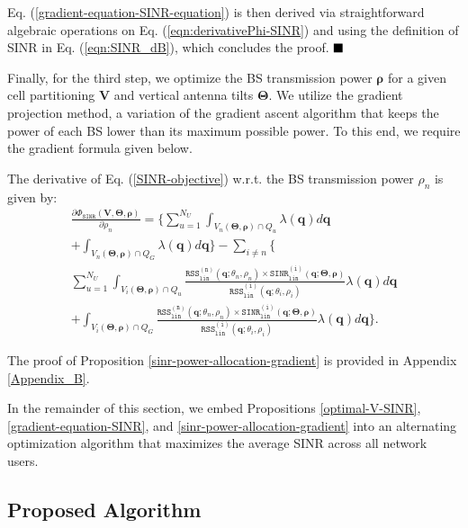 Eq. (\ref{gradient-equation-SINR-equation}) is then derived via straightforward algebraic operations on Eq. (\ref{eqn:derivativePhi-SINR}) and using the definition of SINR in Eq. (\ref{eqn:SINR_dB}), which concludes the proof. $\hfill\blacksquare$


Finally, for the third step, we optimize the BS transmission power $\bm{\rho}$ for a given cell partitioning $\bm{V}$ and vertical antenna tilts $\bm{\Theta}$. We utilize the gradient projection method, a variation of the gradient ascent algorithm that keeps the power of each BS lower than its maximum possible power. To this end, we require the gradient formula given below.
\begin{Proposition}\label{sinr-power-allocation-gradient}
The derivative of Eq. (\ref{SINR-objective}) w.r.t. the BS transmission power $\rho_n$ is given by:
\begin{multline}\label{sinr-power-allocation-gradient-equation}
     \frac{\partial \Phi_{\mathtt{SINR}}(\bm{V}, \bm{\Theta}, \bm{\rho})}{\partial \rho_n} =   \Bigg\{ \sum_{u=1}^{N_U} \int_{V_n(\mathbf{\Theta}, \bm{\rho})\cap Q_u}   \lambda(\bm{q}) d\bm{q}  
    \\+  \int_{V_n(\mathbf{\Theta}, \bm{\rho})\cap Q_G}  \lambda(\bm{q}) d\bm{q} \Bigg\}   - \sum_{i\neq n}^{}  \Bigg\{ \\ \sum_{u=1}^{N_U} \int_{V_i(\mathbf{\Theta}, \bm{\rho})\cap Q_u} \!\!\!\!\!\!\!\!\! \!\!\!\!\frac{\mathtt{RSS_{lin}^{(n)}}(\bm{q};\theta_n,\rho_n) \times \mathtt{SINR_{lin}^{(i)}}(\bm{q}; \bm{\Theta},\bm{\rho})}{\mathtt{RSS_{lin}^{(i)}}(\bm{q};\theta_i,\rho_i)} \lambda(\bm{q}) d\bm{q}
    \\+ \int_{V_i(\mathbf{\Theta}, \bm{\rho})\cap Q_G} \!\!\!\!\!\!\!\!\!\!\!\!\! \frac{\mathtt{RSS_{lin}^{(n)}}(\bm{q};\theta_n,\rho_n) \times \mathtt{SINR_{lin}^{(i)}}(\bm{q}; \bm{\Theta},\bm{\rho})}{\mathtt{RSS_{lin}^{(i)}}(\bm{q};\theta_i,\rho_i)} \lambda(\bm{q}) d\bm{q} \Bigg\}.
\end{multline}
\end{Proposition}
\noindent The proof of Proposition \ref{sinr-power-allocation-gradient} is provided in Appendix \ref{Appendix_B}.



In the remainder of this section, we embed Propositions \ref{optimal-V-SINR}, \ref{gradient-equation-SINR}, and \ref{sinr-power-allocation-gradient} into an alternating optimization algorithm that maximizes the average SINR across all network users.


\subsection{Proposed Algorithm}\label{SINR-Algorithm}

